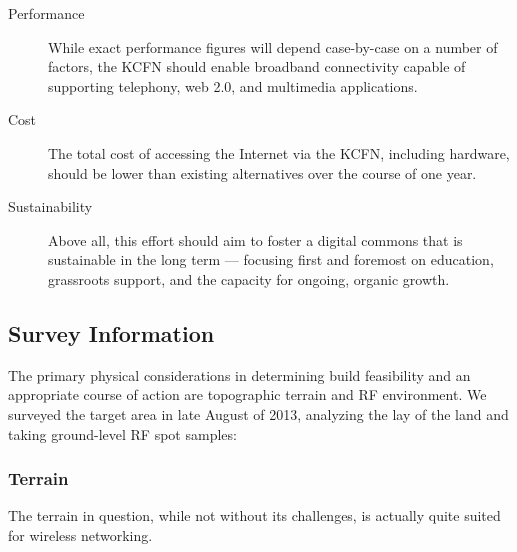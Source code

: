 \begin{description}
\item[Performance] While exact performance figures will depend case-by-case on a
number of factors, the KCFN should enable broadband connectivity capable of supporting
telephony, web 2.0, and multimedia applications.

\item[Cost] The total cost of
accessing the Internet via the KCFN, including hardware, should be lower than existing
alternatives over the course of one year.

\item[Sustainability] Above all, this effort should aim to foster a digital commons 
that is sustainable in the long term --- focusing first and foremost on education, grassroots
support, and the capacity for ongoing, organic growth.
\end{description}


\subsection{Survey Information}
The primary physical considerations in determining build feasibility and an
appropriate course of action are topographic terrain and RF environment. We
surveyed the target area in late August of 2013, analyzing the lay of the land
and taking ground-level RF spot samples: \par
\subsubsection{Terrain}
The terrain in question, while not without its challenges, is actually quite
suited for  wireless networking. \par
\begin{center}
\end{center}

